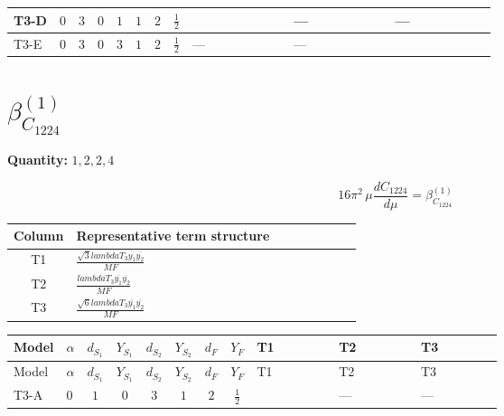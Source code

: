 \documentclass[8pt]{article}
\begin{document}
\begin{landscape}
\begin{longtable}{@{}llcccccc >{\raggedright\arraybackslash}p{0.21\linewidth} >{\raggedright\arraybackslash}p{0.21\linewidth} >{\raggedright\arraybackslash}p{0.21\linewidth}@{}}
\midrule
T3-D & $0$ & $3$ & $0$ & $1$ & $1$ & $2$ & $\frac{1}{2}$ & \scriptsize\adjustbox{max width=\linewidth}{$\begin{gathered} - \frac{\sqrt{3} i lambdaT_{3} \overline{y_{1}} \overline{y_{2}}}{3 MF}\end{gathered}$} & --- & --- \\
\midrule
T3-E & $0$ & $3$ & $0$ & $3$ & $1$ & $2$ & $\frac{1}{2}$ & --- & --- & \scriptsize\adjustbox{max width=\linewidth}{$\begin{gathered} \frac{\sqrt{6} i lambdaT_{3} \overline{y_{1}} \overline{y_{2}}}{3 MF}\end{gathered}$} \\
\midrule
\bottomrule
\end{longtable}
\clearpage
\section*{$\beta_{C_{1224}}^{(1)}$}
\noindent\textbf{Quantity: }$\mathrm{1,2,2,4}$\par\smallskip
\[16\pi^2\,\mu\frac{d C_{1224}}{d\mu}=\beta_{C_{1224}}^{(1)}\]
\begin{center}
\begin{tabular}{@{}c >{\raggedright\arraybackslash}p{0.82\linewidth}@{}}
\toprule
Column & Representative term structure \\
\midrule
T1 & \(\displaystyle \frac{\sqrt{3} lambdaT_{3} \overline{y_{1}} \overline{y_{2}}}{MF}\) \\
\midrule
T2 & \(\displaystyle \frac{lambdaT_{3} \overline{y_{1}} \overline{y_{2}}}{MF}\) \\
\midrule
T3 & \(\displaystyle \frac{\sqrt{6} lambdaT_{3} \overline{y_{1}} \overline{y_{2}}}{MF}\) \\
\midrule
\bottomrule
\end{tabular}
\end{center}
\smallskip
\tiny
\begin{longtable}{@{}llcccccc >{\raggedright\arraybackslash}p{0.21\linewidth} >{\raggedright\arraybackslash}p{0.21\linewidth} >{\raggedright\arraybackslash}p{0.21\linewidth}@{}}
\toprule
Model & $\alpha$ & $d_{S_1}$ & $Y_{S_1}$ & $d_{S_2}$ & $Y_{S_2}$ & $d_F$ & $Y_F$ & T1 & T2 & T3 \\
\midrule
\endfirsthead
\toprule
Model & $\alpha$ & $d_{S_1}$ & $Y_{S_1}$ & $d_{S_2}$ & $Y_{S_2}$ & $d_F$ & $Y_F$ & T1 & T2 & T3 \\
\midrule
\endhead
T3-A & $0$ & $1$ & $0$ & $3$ & $1$ & $2$ & $\frac{1}{2}$ & \scriptsize\adjustbox{max width=\linewidth}{$\begin{gathered} \frac{\sqrt{3} lambdaT_{3} \overline{y_{1}} \overline{y_{2}}}{3 MF}\end{gathered}$} & --- & --- \\

\end{longtable}
\end{landscape}
\end{document}
